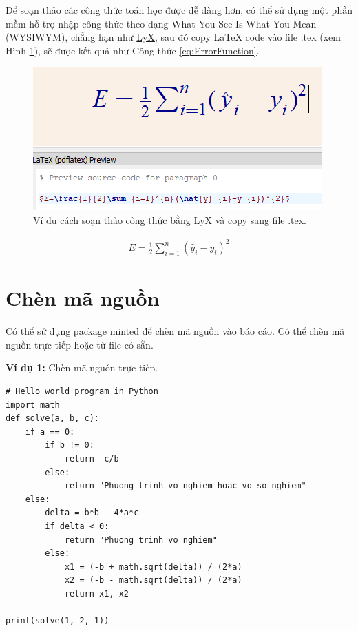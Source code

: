 Để soạn thảo các công thức toán học được dễ dàng hơn, có thể sử dụng một phần mềm hỗ trợ nhập công thức theo dạng What You See Is What You Mean (WYSIWYM), chẳng hạn như \href{https://www.lyx.org/}{LyX}, sau đó copy LaTeX code vào file .tex (xem Hình \ref{lyx_example}), sẽ được kết quả như Công thức \ref{eq:ErrorFunction}.

\begin{center}
    \begin{figure}[h!]
        \begin{center}
            \includegraphics[scale=0.5]{figs/LyX.PNG}
        \end{center}
        \caption{Ví dụ cách soạn thảo công thức bằng LyX và copy sang file .tex.}
        \label{lyx_example}
    \end{figure}
\end{center}

\begin{align}
    E=\frac{1}{2}\sum_{i=1}^{n}(\hat{y}_{i}-y_{i})^{2}
    \label{eq:ErrorFunction}
\end{align}



\section{Chèn mã nguồn}
Có thể sử dụng package minted để chèn mã nguồn vào báo cáo. Có thể chèn mã nguồn trực tiếp hoặc từ file có sẵn.

\noindent\textbf{Ví dụ 1:} Chèn mã nguồn trực tiếp.
\lstset{language=Python}
\begin{lstlisting}
# Hello world program in Python
import math
def solve(a, b, c):
    if a == 0:
        if b != 0:
            return -c/b
        else:
            return "Phuong trinh vo nghiem hoac vo so nghiem"
    else:
        delta = b*b - 4*a*c
        if delta < 0:
            return "Phuong trinh vo nghiem"
        else:
            x1 = (-b + math.sqrt(delta)) / (2*a)
            x2 = (-b - math.sqrt(delta)) / (2*a)
            return x1, x2

print(solve(1, 2, 1))
\end{lstlisting}

